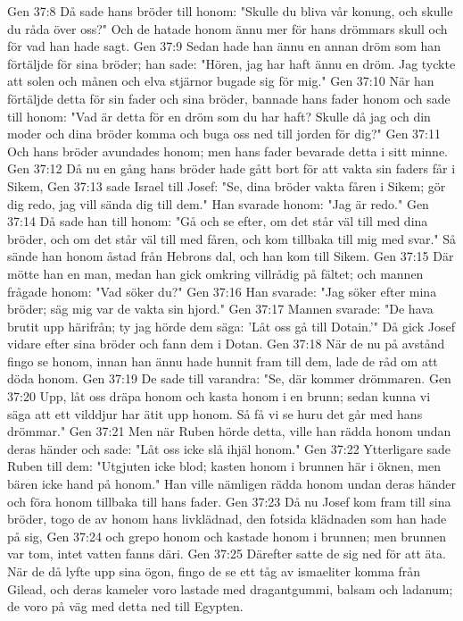 Gen 37:8  Då sade hans bröder till honom: "Skulle du bliva vår konung, och skulle du råda över oss?" Och de hatade honom ännu mer för hans drömmars skull och för vad han hade sagt.
Gen 37:9  Sedan hade han ännu en annan dröm som han förtäljde för sina bröder; han sade: "Hören, jag har haft ännu en dröm. Jag tyckte att solen och månen och elva stjärnor bugade sig för mig."
Gen 37:10  När han förtäljde detta för sin fader och sina bröder, bannade hans fader honom och sade till honom: "Vad är detta för en dröm som du har haft? Skulle då jag och din moder och dina bröder komma och buga oss ned till jorden för dig?"
Gen 37:11  Och hans bröder avundades honom; men hans fader bevarade detta i sitt minne.
Gen 37:12  Då nu en gång hans bröder hade gått bort för att vakta sin faders får i Sikem,
Gen 37:13  sade Israel till Josef: "Se, dina bröder vakta fåren i Sikem; gör dig redo, jag vill sända dig till dem." Han svarade honom: "Jag är redo."
Gen 37:14  Då sade han till honom: "Gå och se efter, om det står väl till med dina bröder, och om det står väl till med fåren, och kom tillbaka till mig med svar." Så sände han honom åstad från Hebrons dal, och han kom till Sikem.
Gen 37:15  Där mötte han en man, medan han gick omkring villrådig på fältet; och mannen frågade honom: "Vad söker du?"
Gen 37:16  Han svarade: "Jag söker efter mina bröder; säg mig var de vakta sin hjord."
Gen 37:17  Mannen svarade: "De hava brutit upp härifrån; ty jag hörde dem säga: 'Låt oss gå till Dotain.'" Då gick Josef vidare efter sina bröder och fann dem i Dotan.
Gen 37:18  När de nu på avstånd fingo se honom, innan han ännu hade hunnit fram till dem, lade de råd om att döda honom.
Gen 37:19  De sade till varandra: "Se, där kommer drömmaren.
Gen 37:20  Upp, låt oss dräpa honom och kasta honom i en brunn; sedan kunna vi säga att ett vilddjur har ätit upp honom. Så få vi se huru det går med hans drömmar."
Gen 37:21  Men när Ruben hörde detta, ville han rädda honom undan deras händer och sade: "Låt oss icke slå ihjäl honom."
Gen 37:22  Ytterligare sade Ruben till dem: "Utgjuten icke blod; kasten honom i brunnen här i öknen, men bären icke hand på honom." Han ville nämligen rädda honom undan deras händer och föra honom tillbaka till hans fader.
Gen 37:23  Då nu Josef kom fram till sina bröder, togo de av honom hans livklädnad, den fotsida klädnaden som han hade på sig,
Gen 37:24  och grepo honom och kastade honom i brunnen; men brunnen var tom, intet vatten fanns däri.
Gen 37:25  Därefter satte de sig ned för att äta. När de då lyfte upp sina ögon, fingo de se ett tåg av ismaeliter komma från Gilead, och deras kameler voro lastade med dragantgummi, balsam och ladanum; de voro på väg med detta ned till Egypten.
